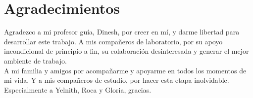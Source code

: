\chapter*{Agradecimientos}
Agradezco a mi profesor guía, Dinesh, por creer en mí, y darme libertad para desarrollar este trabajo. A mis compañeros de laboratorio, por su apoyo incondicional de principio a fin, su colaboración desinteresada y generar el mejor ambiente de trabajo.\\
A mi familia y amigos por acompañarme y apoyarme en todos los momentos de mi vida. Y a mis compañeros de estudio, por hacer esta etapa inolvidable. Especialmente a Yelnith, Roca y Gloria, gracias.



